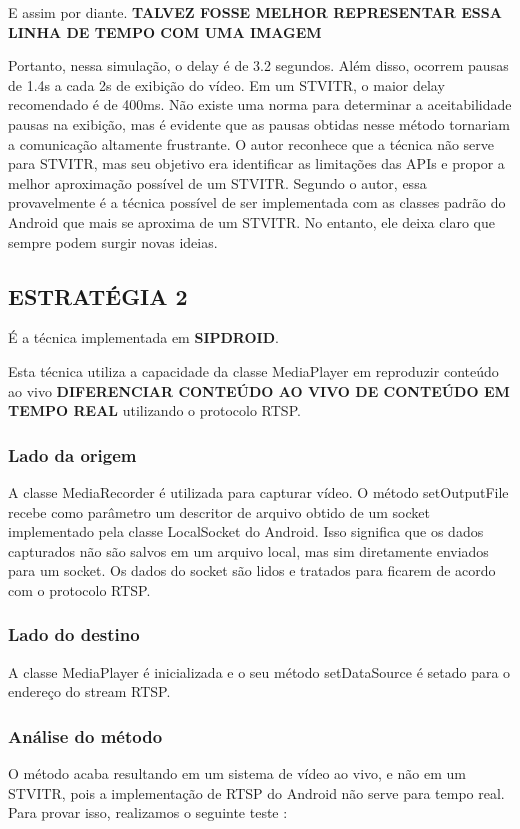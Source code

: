 \documentclass{acm_proc_article-sp}
\newcommand{\todo}[1]{\textcolor[rgb]{1.00,0.00,0.00}{\bf \uppercase{#1}}}
\begin{document}
E assim por diante. \todo{talvez fosse melhor representar essa linha de tempo com uma imagem}

Portanto, nessa simulação, o delay é de 3.2 segundos. Além disso, ocorrem pausas de 1.4s a cada 2s de exibição do vídeo. Em um STVITR, o maior delay recomendado é de 400ms. Não existe uma norma para determinar a aceitabilidade pausas na exibição, mas é evidente que as pausas obtidas nesse método tornariam a comunicação altamente frustrante. O autor reconhece que a técnica não serve para STVITR, mas seu objetivo era identificar as limitações das APIs e propor a melhor aproximação possível de um STVITR. Segundo o autor, essa provavelmente é a técnica possível de ser implementada com as classes padrão do Android que mais se aproxima de um STVITR. No entanto, ele deixa claro que sempre podem surgir novas ideias. 

\subsection{ESTRATÉGIA 2}
É a técnica implementada em \todo{sipdroid}.

Esta técnica utiliza a capacidade da classe MediaPlayer em reproduzir conteúdo ao vivo \todo{diferenciar conteúdo ao vivo de conteúdo em tempo real} utilizando o protocolo RTSP.

\subsubsection{Lado da origem}
A classe MediaRecorder é utilizada para capturar vídeo. O método setOutputFile recebe como parâmetro um descritor de arquivo obtido de um socket implementado pela classe LocalSocket do Android. Isso significa que os dados capturados não são salvos em um arquivo local, mas sim diretamente enviados para um socket. Os dados do socket são lidos e tratados para ficarem de acordo com o protocolo RTSP.

\subsubsection{Lado do destino}
A classe MediaPlayer é inicializada e o seu método setDataSource é setado para o endereço do stream RTSP.

\subsubsection{Análise do método}
O método acaba resultando em um sistema de vídeo ao vivo, e não em um STVITR, pois a implementação de RTSP do Android não serve para tempo real. Para provar isso, realizamos o seguinte teste :
\end{document}
